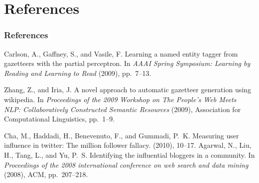 \documentclass{beamer}
\begin{document}
\section*{References}
\begin{frame}[allowframebreaks]
  \frametitle<presentation>{References}    
  \begin{thebibliography}{10}   
 \beamertemplatebookbibitems
{}
{\sc Carlson, A., Gaffney, S., and Vasile, F.}
\newblock Learning a named entity tagger from gazetteers with the partial
  perceptron.
\newblock In {\em AAAI Spring Symposium: Learning by Reading and Learning to
  Read\/} (2009), pp.~7--13.

  \beamertemplatebookbibitems

{\sc Zhang, Z., and Iria, J.}
\newblock A novel approach to automatic gazetteer generation using wikipedia.
\newblock In {\em Proceedings of the 2009 Workshop on The People's Web Meets
  NLP: Collaboratively Constructed Semantic Resources\/} (2009), Association
  for Computational Linguistics, pp.~1--9.

 
  \beamertemplatebookbibitems
{\sc Cha, M., Haddadi, H., Benevenuto, F., and Gummadi, P.~K.}
\newblock Measuring user influence in twitter: The million follower fallacy.
 (2010), 10--17.
  \beamertemplatearticlebibitems
{\sc Agarwal, N., Liu, H., Tang, L., and Yu, P.~S.}
\newblock Identifying the influential bloggers in a community.
\newblock In {\em Proceedings of the 2008 international conference on web
  search and data mining\/} (2008), ACM, pp.~207--218.
  \end{thebibliography}

\end{frame}
\end{document}
